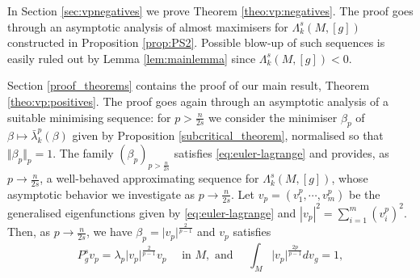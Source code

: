 \documentclass[10pt]{amsart}
\numberwithin{equation}{section}
\theoremstyle{plain}
\theoremstyle{remark}
\begin{document}
\medskip


In Section \ref{sec:vpnegatives} we prove Theorem \ref{theo:vp:negatives}. The proof goes through an asymptotic analysis of almost maximisers for $\Lambda_k^s(M,[g])$ constructed in Proposition \ref{prop:PS2}. Possible blow-up of such sequences is easily ruled out by Lemma \ref{lem:mainlemma} since $\Lambda_k^s(M,[g])< 0$. 


\medskip


Section \ref{proof_theorems} contains the proof of our main result, Theorem \ref{theo:vp:positives}. The proof goes again through an asymptotic analysis of a suitable minimising sequence: for $p > \frac{n}{2s}$ we consider the minimiser $\beta_p$ of $\beta \mapsto \bar{\lambda}_k^p(\beta)$ given by Proposition \ref{subcritical_theorem}, normalised so that $\Vert \beta_p \Vert_p = 1$. The family $(\beta_p)_{p > \frac{n}{2s}}$ satisfies \eqref{eq:euler-lagrange} and provides, as $p \to \frac{n}{2s}$, a well-behaved approximating sequence for $\Lambda_k^s(M,[g])$,
whose asymptotic behavior we investigate as $p \to \frac{n}{2s}$. Let $v_p = (v_1^p,\cdots,v_m^p)$ be the generalised eigenfunctions given by \eqref{eq:euler-lagrange} and $|v_p|^2 = \sum_{i=1}^m (v_i^p)^2$. Then, as $p \to \frac{n}{2s}$, we have $\beta_p = \vert v_p \vert^{\frac{2}{p-1}}$ and $v_p$ satisfies
\begin{equation*} 
P_g^s v_p  = \lambda_p \vert v_p \vert^{\frac{2}{p-1}} v_p \quad \text{ in } M,  \text{ and } \quad \int_M  \vert v_p \vert^{\frac{2p}{p-1}} dv_g = 1, 
\end{equation*}
\end{document}
